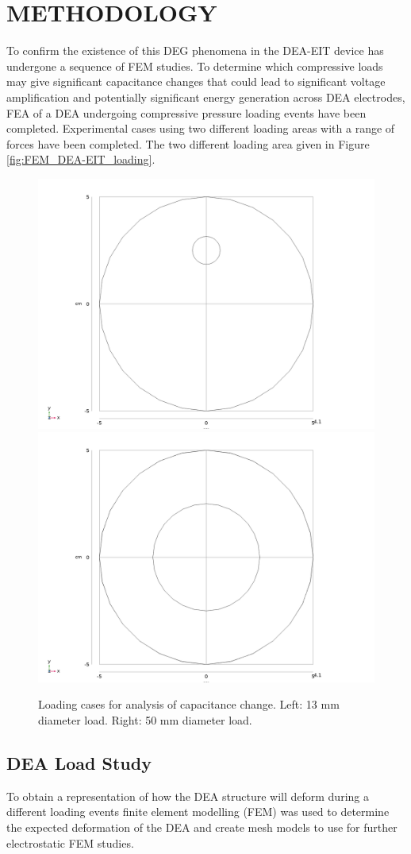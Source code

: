 \section{METHODOLOGY} %
\label{sec:method}
To confirm the existence of this DEG phenomena in the DEA-EIT device has undergone a sequence of FEM studies. To determine which compressive loads may give significant capacitance changes that could lead to significant voltage amplification and potentially significant energy generation across DEA electrodes, FEA of a DEA undergoing compressive pressure loading events have been completed. Experimental cases using two different loading areas with a range of forces have been completed. The two different loading area given in Figure \ref{fig:FEM_DEA-EIT_loading}. 
\begin{figure}[H]
	\centering
	\includegraphics[width=0.45\linewidth]{Figures/d13mm_load_case_comsol2d.png}
	\includegraphics[width=0.45\linewidth]{Figures/d50mm_load_case_comsol2d.png}
	\caption{Loading cases for analysis of capacitance change. Left: 13 mm diameter load. Right: 50 mm diameter load.}
	\label{fig:DEA-EIT_loading}
\end{figure}


\subsection{DEA Load Study}
To obtain a representation of how the DEA structure will deform during a different loading events finite element modelling (FEM) was used to determine the expected deformation of the DEA and create mesh models to use for further electrostatic FEM studies.

